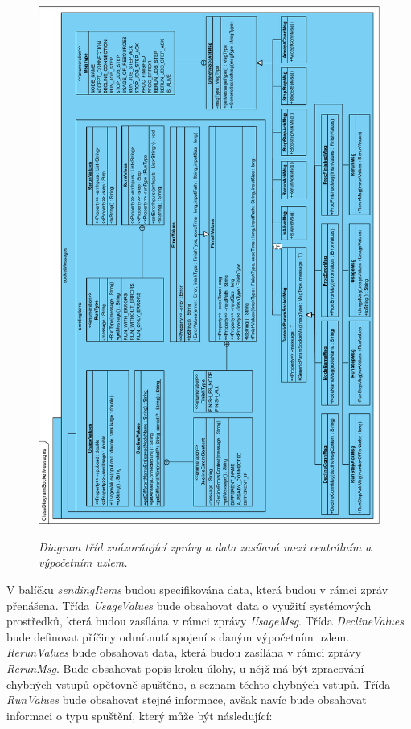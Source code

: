 \begin{figure}[H]
\begin{center}
    \scalebox{0.5}
    {
        \includegraphics{images/ClassDiagramSocketMessages.pdf}
    }
    \caption{\label{obr:classDiagramSocketMessages} {\it Diagram tříd znázorňující zprávy a data zasílaná mezi centrálním a výpočetním uzlem.}}
\end{center}
\end{figure}

V balíčku \textit{sendingItems} budou specifikována data, která budou v rámci zpráv přenášena. Třída \textit{UsageValues} bude obsahovat data o využití systémových prostředků, která budou zasílána v rámci zprávy \textit{UsageMsg}. Třída \textit{DeclineValues} bude definovat příčiny odmítnutí spojení s daným výpočetním uzlem. \textit{RerunValues} bude obsahovat data, která budou zasílána v rámci zprávy \textit{RerunMsg}. Bude obsahovat popis kroku úlohy, u nějž má být zpracování chybných vstupů opětovně spuštěno, a seznam těchto chybných vstupů. Třída \textit{RunValues} bude obsahovat stejné informace, avšak navíc bude obsahovat informaci o typu spuštění, který může být následující:

